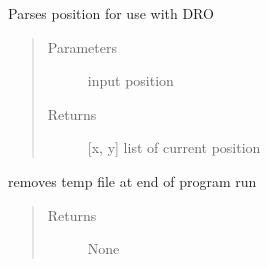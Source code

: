 \documentclass[letterpaper,10pt,english]{sphinxmanual}
\begin{document}
\begin{fulllineitems}
\begin{fulllineitems}
\begin{quote}
\begin{description}
\end{description}\end{quote}

\end{fulllineitems}


\begin{fulllineitems}
\label{\detokenize{index:droogCNC.TwoAxisStage.__parsePosition}}
\sphinxAtStartPar
Parses position for use with DRO
\begin{quote}\begin{description}
\item[{Parameters}] \leavevmode
\sphinxAtStartPar
{} \textendash{} input position

\item[{Returns}] \leavevmode
\sphinxAtStartPar
{[}x, y{]} list of current position

\end{description}\end{quote}

\end{fulllineitems}


\begin{fulllineitems}
\label{\detokenize{index:droogCNC.TwoAxisStage.__removeTempFile}}
\sphinxAtStartPar
removes temp file at end of program run
\begin{quote}\begin{description}
\item[{Returns}] \leavevmode
\sphinxAtStartPar
None

\end{description}\end{quote}

\end{fulllineitems}



\end{fulllineitems}
\end{document}
